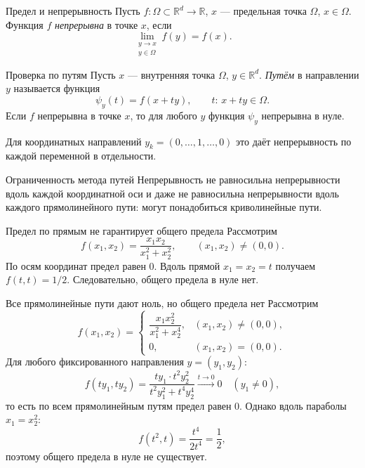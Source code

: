 \begin{Definition}{Предел и непрерывность}{}
	Пусть $f:\Omega\subset\mathbb R^d\to\mathbb R$, $x$ --- предельная точка $\Omega$, $x\in\Omega$.
	Функция $f$ \emph{непрерывна} в точке $x$, если
	\[
	\lim_{\substack{y\to x\\y\in\Omega}}f(y)=f(x).
	\]
\end{Definition}

\begin{Definition}{Проверка по путям}{}
	Пусть $x$ --- внутренняя точка $\Omega$, $y\in\mathbb R^d$. \emph{Путём} в направлении $y$ называется функция
	\[
	\psi_y(t)=f(x+ty),\qquad t:\,x+ty\in\Omega.
	\]
	Если $f$ непрерывна в точке $x$, то для любого $y$ функция $\psi_y$ непрерывна в нуле.
	
	Для координатных направлений $y_k=(0,\ldots,1,\ldots,0)$
	это даёт непрерывность по каждой переменной в отдельности.
\end{Definition}

\begin{Remark}{Ограниченность метода путей}{}
	Непрерывность не равносильна непрерывности вдоль каждой координатной оси
	и даже не равносильна непрерывности вдоль каждого прямолинейного пути:
	могут понадобиться криволинейные пути.
\end{Remark}

\begin{Example}{Предел по прямым не гарантирует общего предела}{}
	Рассмотрим
	\[
	f(x_1,x_2)=\frac{x_1 x_2}{x_1^2+x_2^2},\qquad (x_1,x_2)\ne(0,0).
	\]
	По осям координат предел равен $0$. Вдоль прямой $x_1=x_2=t$ получаем $f(t,t)=1/2$.
	Следовательно, общего предела в нуле нет.
\end{Example}

\begin{Example}{Все прямолинейные пути дают ноль, но общего предела нет}{}
	Рассмотрим
	\[
	f(x_1,x_2)=
	\begin{cases}
		\dfrac{x_1 x_2^2}{x_1^2+x_2^4}, & (x_1,x_2)\ne(0,0),\\[6pt]
		0, & (x_1,x_2)=(0,0).
	\end{cases}
	\]
	Для любого фиксированного направления $y=(y_1,y_2)$:
	\[
	f(ty_1,ty_2)=\frac{ty_1\cdot t^2y_2^2}{t^2y_1^2+t^4y_2^4}\xrightarrow{t\to0}0
	\quad(y_1\ne0),
	\]
	то есть по всем прямолинейным путям предел равен $0$.
	Однако вдоль параболы $x_1=x_2^2$:
	\[
	f(t^2,t)=\frac{t^4}{2t^4}=\frac12,
	\]
	поэтому общего предела в нуле не существует.
\end{Example}

